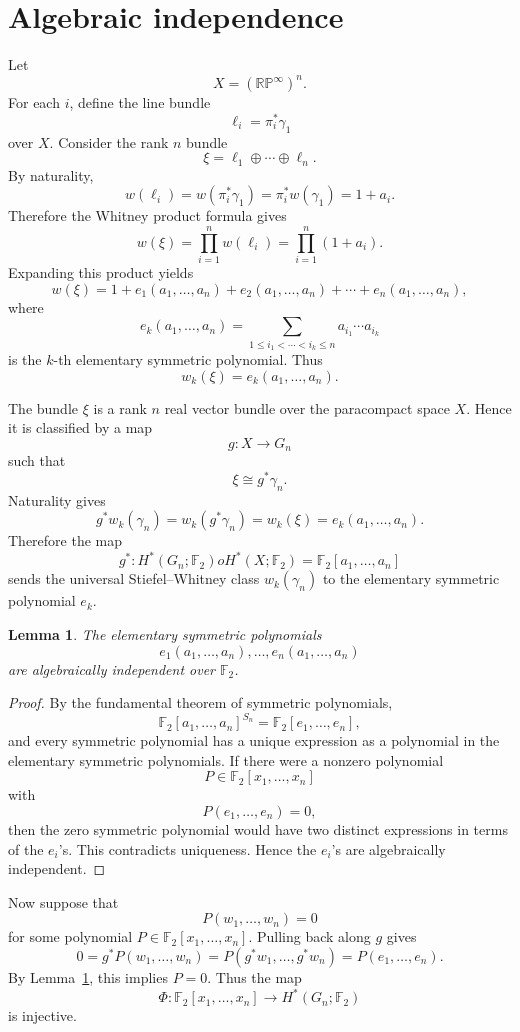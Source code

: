 \documentclass[11pt]{article}
\newcommand{\F}{\mathbb F}
\newcommand{\RP}{\mathbb{RP}}
\theoremstyle{plain}
\newtheorem{lemma}[theorem]{Lemma}
\theoremstyle{definition}
\numberwithin{equation}{section}
\begin{document}
\section{Algebraic independence}

Let
\[
  X=(\RP^\infty)^n.
\]
For each $i$, define the line bundle
\[
  \ell_i=\pi_i^*\gamma_1
\]
over $X$.  Consider the rank $n$ bundle
\[
  \xi=\ell_1\oplus\cdots\oplus\ell_n.
\]
By naturality,
\[
  w(\ell_i)
  =w(\pi_i^*\gamma_1)
  =\pi_i^*w(\gamma_1)
  =1+a_i.
\]
Therefore the Whitney product formula gives
\[
  w(\xi)
  =\prod_{i=1}^n w(\ell_i)
  =\prod_{i=1}^n(1+a_i).
\]
Expanding this product yields
\[
  w(\xi)
  =1+e_1(a_1,\ldots,a_n)+e_2(a_1,\ldots,a_n)+\cdots+e_n(a_1,\ldots,a_n),
\]
where
\[
  e_k(a_1,\ldots,a_n)
  =
  \sum_{1\leq i_1<\cdots<i_k\leq n}
  a_{i_1}\cdots a_{i_k}
\]
is the $k$-th elementary symmetric polynomial.  Thus
\[
  w_k(\xi)=e_k(a_1,\ldots,a_n).
\]

The bundle $\xi$ is a rank $n$ real vector bundle over the paracompact space $X$.  Hence it is classified by a map
\[
  g:X\to G_n
\]
such that
\[
  \xi\cong g^*\gamma_n.
\]
Naturality gives
\[
  g^*w_k(\gamma_n)
  =w_k(g^*\gamma_n)
  =w_k(\xi)
  =e_k(a_1,\ldots,a_n).
\]
Therefore the map
\[
  g^*:H^*(G_n;\F_2)	o H^*(X;\F_2)=\F_2[a_1,\ldots,a_n]
\]
sends the universal Stiefel--Whitney class $w_k(\gamma_n)$ to the elementary symmetric polynomial $e_k$.

\begin{lemma}\label{lem:algindep}
The elementary symmetric polynomials
\[
  e_1(a_1,\ldots,a_n),\ldots,e_n(a_1,\ldots,a_n)
\]
are algebraically independent over $\F_2$.
\end{lemma}

\begin{proof}
By the fundamental theorem of symmetric polynomials,
\[
  \F_2[a_1,\ldots,a_n]^{S_n}
  =
  \F_2[e_1,\ldots,e_n],
\]
and every symmetric polynomial has a unique expression as a polynomial in the elementary symmetric polynomials.  If there were a nonzero polynomial
\[
  P\in \F_2[x_1,\ldots,x_n]
\]
with
\[
  P(e_1,\ldots,e_n)=0,
\]
then the zero symmetric polynomial would have two distinct expressions in terms of the $e_i$'s.  This contradicts uniqueness.  Hence the $e_i$'s are algebraically independent.
\end{proof}

Now suppose that
\[
  P(w_1,\ldots,w_n)=0
\]
for some polynomial $P\in\F_2[x_1,\ldots,x_n]$.  Pulling back along $g$ gives
\[
  0
  =g^*P(w_1,\ldots,w_n)
  =P(g^*w_1,\ldots,g^*w_n)
  =P(e_1,\ldots,e_n).
\]
By Lemma~\ref{lem:algindep}, this implies $P=0$.  Thus the map
\[
  \Phi:\F_2[x_1,\ldots,x_n]\to H^*(G_n;\F_2)
\]
is injective.
\end{document}
